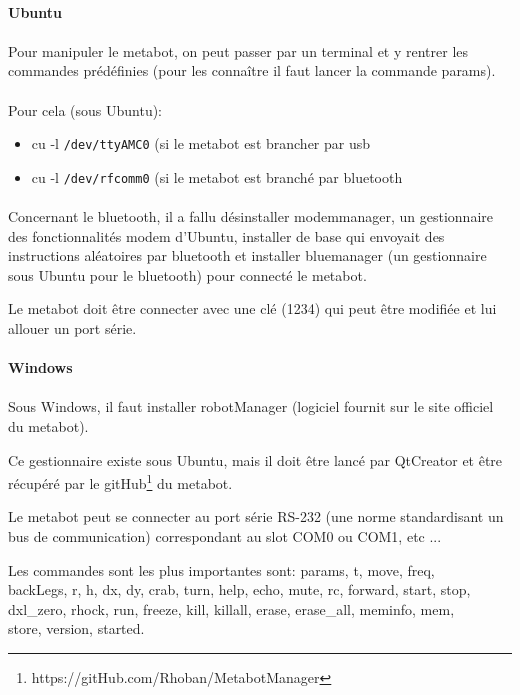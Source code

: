 \documentclass[10pt,a4paper]{report}
\begin{document}
\paragraph{Ubuntu}
\paragraph{}
Pour manipuler le metabot, on peut passer par un terminal et y rentrer les commandes prédéfinies (pour les connaître il faut lancer la commande params).
\paragraph{}
Pour cela (sous Ubuntu): 
\begin{itemize}
\item cu -l \texttt{/dev/ttyAMC0} (si le metabot est brancher par usb
\item cu -l \texttt{/dev/rfcomm0} (si le metabot est branché par bluetooth
\end{itemize}
\paragraph{}
Concernant le bluetooth, il a fallu désinstaller modemmanager, un gestionnaire des fonctionnalités modem d'Ubuntu, installer de base qui envoyait des instructions aléatoires par bluetooth et installer bluemanager (un gestionnaire sous Ubuntu pour le bluetooth) pour connecté le metabot.

Le metabot doit être connecter avec une clé (1234) qui peut être modifiée et lui allouer un port série.
\paragraph{Windows}
\paragraph{}
Sous Windows, il faut installer robotManager (logiciel fournit sur le site officiel du metabot).

Ce gestionnaire existe sous Ubuntu, mais il doit être lancé par QtCreator et être récupéré par le  gitHub\footnote{https://gitHub.com/Rhoban/MetabotManager} du metabot.

Le metabot peut se connecter au port série RS-232 (une norme standardisant un bus de communication) correspondant au slot COM0 ou COM1, etc ...

Les commandes sont les plus importantes sont: params,  t, move, freq, \\backLegs, r, h, dx, dy, crab, turn, help, echo, mute, rc, forward, start, stop,\\ dxl\_zero, rhock, run, freeze, kill, killall, erase, erase\_all, meminfo, mem, \\store, version, started.
\end{document}
